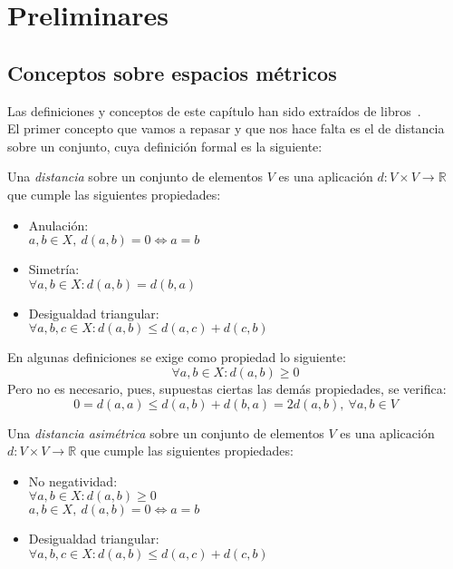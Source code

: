 
\setchapterpreamble[c][0.75\linewidth]{%
	\sffamily
	\par\bigskip
}
\chapter{Preliminares}\label{ch:primer-capitulo}

\section{Conceptos sobre espacios métricos}
Las definiciones y conceptos de este capítulo han sido extraídos de libros~\cite{topo}. \\

El primer concepto que vamos a repasar y que nos hace falta es el de distancia sobre un conjunto, cuya definición formal es la siguiente:

\begin{definicion}
	Una \textit{distancia} sobre un conjunto de elementos $V$ es una aplicación $d:V\times V\rightarrow \mathbb{R}$ que cumple las siguientes propiedades:
	\begin{itemize}
		\item Anulación:
		\\ \hspace*{1cm}$a,b \in X,\ d(a,b)=0\Leftrightarrow a=b$
		\item Simetría:
		\\ \hspace*{1cm}$\forall a,b \in X: d(a,b)=d(b,a)$
		\item Desigualdad triangular:
		\\ \hspace*{1cm}$\forall a,b,c \in X: d(a,b)\leq d(a,c)+d(c,b)$
	\end{itemize}
\end{definicion}

En algunas definiciones se exige como propiedad lo siguiente:
$$\forall a,b\in X:d(a,b) \geq 0$$
Pero no es necesario, pues, supuestas ciertas las demás propiedades, se verifica:
$$0=d(a,a)\leq d(a,b) + d(b,a) = 2d(a,b),\ \forall a,b\in V$$

\begin{definicion}
	Una \textit{distancia asimétrica} sobre un conjunto de elementos $V$ es una aplicación $d:V\times V\rightarrow \mathbb{R}$ que cumple las siguientes propiedades:
	\begin{itemize}
		\item No negatividad:
		\\ \hspace*{1cm}$\forall a,b\in X:d(a,b) \geq 0$
		\\ \hspace*{1cm}$a,b \in X,\ d(a,b)=0\Leftrightarrow a=b$
		\item Desigualdad triangular:
		\\ \hspace*{1cm}$\forall a,b,c \in X: d(a,b)\leq d(a,c)+d(c,b)$
	\end{itemize}
\end{definicion}

